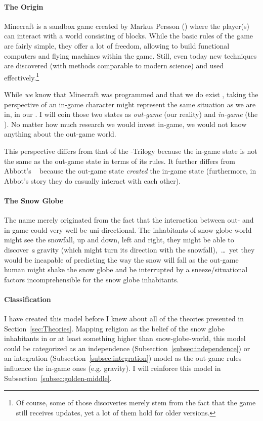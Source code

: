 \paragraph{The Origin} Minecraft is a sandbox game created by Markus Persson () where the player(s) can interact with a world consisting of blocks. While the basic rules of the game are fairly simple, they offer a lot of freedom, allowing to build functional computers and flying machines within the game. Still, even today new techniques are discovered (with methods comparable to modern science) and used effectively.\footnote{Of course, some of those discoveries merely stem from the fact that the game still receives updates, yet a lot of them hold for older versions.}

While \emph{we} know that Minecraft was programmed and that we do exist , taking the perspective of an in-game character might represent the same situation as we are in, in our . I will coin those two states as \emph{out-game} (our reality) and \emph{in-game} (the ).
No matter how much research we would invest in-game, we would not know anything about the out-game world.

This perspective differs from that of the -Trilogy because the in-game state is not the same as the  out-game state in terms of its rules.
It further differs from Abbott's ~\cite{abbott1987flatland} because the out-game state \emph{created} the in-game state (furthermore, in Abbot's story they do casually interact with each other).

\paragraph{The Snow Globe}
The name  merely originated from the fact that the interaction between out- and in-game could very well be uni-directional.
The inhabitants of snow-globe-world might see the snowfall, up and down, left and right, they might be able to discover \textit{a} gravity (which might turn its direction with the snowfall),~\ldots\ yet they would be incapable of predicting the way the snow will fall as the out-game human might shake the snow globe and be interrupted by a sneeze/situational factors incomprehensible for the snow globe inhabitants.


\paragraph{Classification}
I have created this model before I knew about all of the theories presented in Section~\ref{sec:Theories}. Mapping religion as the belief of the snow globe inhabitants in  or at least something higher than snow-globe-world, this model could be categorized as an independence (Subsection~\ref{subsec:independence}) or an integration (Subsection~\ref{subsec:integration}) model as the out-game rules influence the in-game ones (e.g. gravity).
I will reinforce this model in Subsection~\ref{subsec:golden-middle}.

